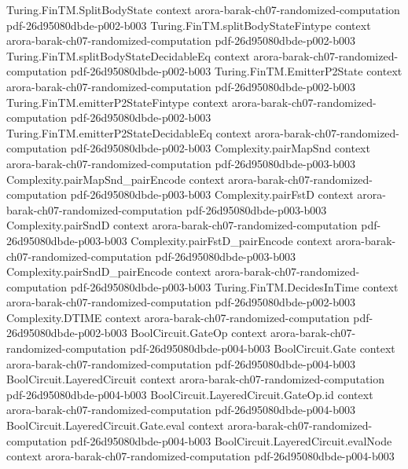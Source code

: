 \begin{theorem}
\proofstep
  {Turing.FinTM.SplitBodyState}
  {context}
  {arora-barak-ch07-randomized-computation}
  {pdf-26d95080dbde-p002-b003}
\proofstep
  {Turing.FinTM.splitBodyStateFintype}
  {context}
  {arora-barak-ch07-randomized-computation}
  {pdf-26d95080dbde-p002-b003}
\proofstep
  {Turing.FinTM.splitBodyStateDecidableEq}
  {context}
  {arora-barak-ch07-randomized-computation}
  {pdf-26d95080dbde-p002-b003}
\proofstep
  {Turing.FinTM.EmitterP2State}
  {context}
  {arora-barak-ch07-randomized-computation}
  {pdf-26d95080dbde-p002-b003}
\proofstep
  {Turing.FinTM.emitterP2StateFintype}
  {context}
  {arora-barak-ch07-randomized-computation}
  {pdf-26d95080dbde-p002-b003}
\proofstep
  {Turing.FinTM.emitterP2StateDecidableEq}
  {context}
  {arora-barak-ch07-randomized-computation}
  {pdf-26d95080dbde-p002-b003}
\proofstep
  {Complexity.pairMapSnd}
  {context}
  {arora-barak-ch07-randomized-computation}
  {pdf-26d95080dbde-p003-b003}
\proofstep
  {Complexity.pairMapSnd_pairEncode}
  {context}
  {arora-barak-ch07-randomized-computation}
  {pdf-26d95080dbde-p003-b003}
\proofstep
  {Complexity.pairFstD}
  {context}
  {arora-barak-ch07-randomized-computation}
  {pdf-26d95080dbde-p003-b003}
\proofstep
  {Complexity.pairSndD}
  {context}
  {arora-barak-ch07-randomized-computation}
  {pdf-26d95080dbde-p003-b003}
\proofstep
  {Complexity.pairFstD_pairEncode}
  {context}
  {arora-barak-ch07-randomized-computation}
  {pdf-26d95080dbde-p003-b003}
\proofstep
  {Complexity.pairSndD_pairEncode}
  {context}
  {arora-barak-ch07-randomized-computation}
  {pdf-26d95080dbde-p003-b003}
\proofstep
  {Turing.FinTM.DecidesInTime}
  {context}
  {arora-barak-ch07-randomized-computation}
  {pdf-26d95080dbde-p002-b003}
\proofstep
  {Complexity.DTIME}
  {context}
  {arora-barak-ch07-randomized-computation}
  {pdf-26d95080dbde-p002-b003}
\proofstep
  {BoolCircuit.GateOp}
  {context}
  {arora-barak-ch07-randomized-computation}
  {pdf-26d95080dbde-p004-b003}
\proofstep
  {BoolCircuit.Gate}
  {context}
  {arora-barak-ch07-randomized-computation}
  {pdf-26d95080dbde-p004-b003}
\proofstep
  {BoolCircuit.LayeredCircuit}
  {context}
  {arora-barak-ch07-randomized-computation}
  {pdf-26d95080dbde-p004-b003}
\proofstep
  {BoolCircuit.LayeredCircuit.GateOp.id}
  {context}
  {arora-barak-ch07-randomized-computation}
  {pdf-26d95080dbde-p004-b003}
\proofstep
  {BoolCircuit.LayeredCircuit.Gate.eval}
  {context}
  {arora-barak-ch07-randomized-computation}
  {pdf-26d95080dbde-p004-b003}
\proofstep
  {BoolCircuit.LayeredCircuit.evalNode}
  {context}
  {arora-barak-ch07-randomized-computation}
  {pdf-26d95080dbde-p004-b003}

\end{theorem}

